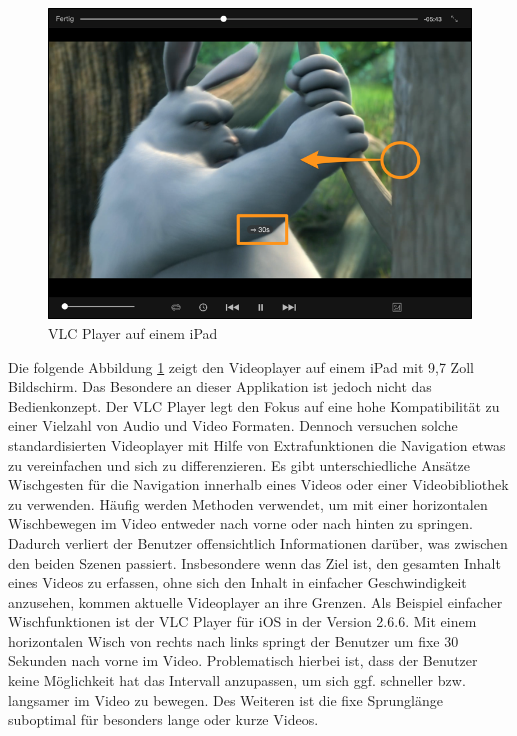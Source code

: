 \documentclass[11pt,a4paper]{report}
\begin{document}
\begin{figure}[h]
\begin{center}
\includegraphics[scale=1.0]{./images/9.png}
\caption{VLC Player auf einem iPad}
\label{vlc_ipad}
\end{center}
\end{figure}Die folgende Abbildung \ref{vlc_ipad} zeigt den Videoplayer auf einem iPad mit 9,7 Zoll Bildschirm. Das Besondere an dieser Applikation ist jedoch nicht das Bedienkonzept. Der VLC Player legt den Fokus auf eine hohe Kompatibilität zu einer Vielzahl von Audio und Video Formaten. Dennoch versuchen solche standardisierten Videoplayer mit Hilfe von Extrafunktionen die Navigation etwas zu vereinfachen und sich zu differenzieren. Es gibt unterschiedliche Ansätze Wischgesten für die Navigation innerhalb eines Videos oder einer Videobibliothek zu verwenden. Häufig werden Methoden verwendet, um mit einer horizontalen Wischbewegen im Video entweder nach vorne oder nach hinten zu springen. Dadurch verliert der Benutzer offensichtlich Informationen darüber, was zwischen den beiden Szenen passiert. Insbesondere wenn das Ziel ist, den gesamten Inhalt eines Videos zu erfassen, ohne sich den Inhalt in einfacher Geschwindigkeit anzusehen, kommen aktuelle Videoplayer an ihre Grenzen. Als Beispiel einfacher Wischfunktionen ist der VLC Player für iOS in der Version 2.6.6. Mit einem horizontalen Wisch von rechts nach links springt der Benutzer um fixe 30 Sekunden nach vorne im Video. Problematisch hierbei ist, dass der Benutzer keine Möglichkeit hat das Intervall anzupassen, um sich ggf. schneller bzw. langsamer im Video zu bewegen. Des Weiteren ist die fixe Sprunglänge suboptimal für besonders lange oder kurze Videos. \cite{VideoLANVLCPlayerforiOS}
\end{document}
